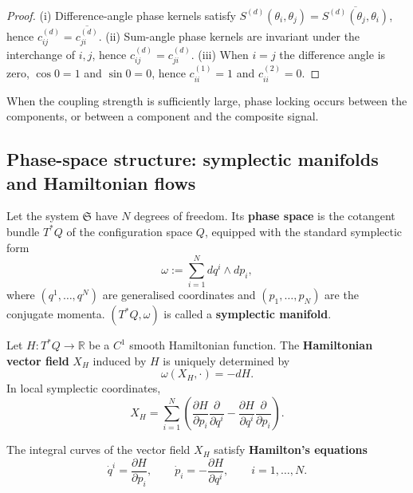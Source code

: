 \begin{proof}
(i) Difference-angle phase kernels satisfy $S^{(d)}(\theta_i,\theta_j)=\overline{S^{(d)}(\theta_j,\theta_i)}$, hence $c_{ij}^{(d)}=\overline{c_{ji}^{(d)}}$.
(ii) Sum-angle phase kernels are invariant under the interchange of $i,j$, hence $c_{ij}^{(d)}=c_{ji}^{(d)}$.
(iii) When $i=j$ the difference angle is zero, $\cos 0=1$ and $\sin 0=0$, hence $c_{ii}^{(1)}=1$ and $c_{ii}^{(2)}=0$.
\end{proof}

\begin{proposition}\label{prop:phase-locking}
When the coupling strength is sufficiently large, phase locking occurs between the components, or between a component and the composite signal.
\end{proposition}

\subsection{Phase-space structure: symplectic manifolds and Hamiltonian flows}\label{subsec:ps_phase_space_symplectic}

\begin{definition}\label{def:ps_phase_space}
Let the system $\mathfrak{S}$ have $N$ degrees of freedom. Its \textbf{phase space} is the cotangent bundle $T^*Q$ of the configuration space $Q$, equipped with the standard symplectic form
\[
\omega := \sum_{i=1}^{N} dq^i\wedge dp_i,
\]
where $(q^1,\dots,q^N)$ are generalised coordinates and $(p_1,\dots,p_N)$ are the conjugate momenta. $(T^*Q,\omega)$ is called a \textbf{symplectic manifold}.
\end{definition}

\begin{definition}\label{def:ps_hamiltonian_field}
Let $H:T^*Q\to\mathbb{R}$ be a $C^1$ smooth Hamiltonian function. The \textbf{Hamiltonian vector field} $X_H$ induced by $H$ is uniquely determined by
\[
\omega(X_H,\cdot) = -dH.
\]
In local symplectic coordinates,
\[
X_H = \sum_{i=1}^{N}\left(\frac{\partial H}{\partial p_i}\frac{\partial}{\partial q^i} - \frac{\partial H}{\partial q^i}\frac{\partial}{\partial p_i}\right).
\]
\end{definition}

\begin{proposition}\label{prop:ps_hamiltonian_equations}
The integral curves of the vector field $X_H$ satisfy \textbf{Hamilton's equations}
\[
\dot{q}^i = \frac{\partial H}{\partial p_i}, \qquad \dot{p}_i = -\frac{\partial H}{\partial q^i}, \qquad i = 1,\dots,N.
\]
\end{proposition}

